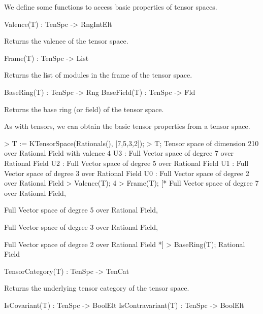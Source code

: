 We define some functions to access basic properties of tensor spaces.

\begin{intrinsics}
Valence(T) : TenSpc -> RngIntElt
\end{intrinsics}

Returns the valence of the tensor space.

\begin{intrinsics}
Frame(T) : TenSpc -> List
\end{intrinsics}

Returns the list of modules in the frame of the tensor space.

\begin{intrinsics}
BaseRing(T) : TenSpc -> Rng
BaseField(T) : TenSpc -> Fld
\end{intrinsics}

Returns the base ring (or field) of the tensor space.

\begin{example}[TenSpcProperties]

As with tensors, we can obtain the basic tensor properties from a tensor space.
\begin{code}
> T := KTensorSpace(Rationals(), [7,5,3,2]);
> T;
Tensor space of dimension 210 over Rational Field with valence 4
U3 : Full Vector space of degree 7 over Rational Field
U2 : Full Vector space of degree 5 over Rational Field
U1 : Full Vector space of degree 3 over Rational Field
U0 : Full Vector space of degree 2 over Rational Field
> Valence(T);
4
> Frame(T);
[*
    Full Vector space of degree 7 over Rational Field,

    Full Vector space of degree 5 over Rational Field,

    Full Vector space of degree 3 over Rational Field,

    Full Vector space of degree 2 over Rational Field
*]
> BaseRing(T);
Rational Field
\end{code}
\end{example}


\begin{intrinsics}
TensorCategory(T) : TenSpc -> TenCat
\end{intrinsics}

Returns the underlying tensor category of the tensor space.

\begin{intrinsics}
IsCovariant(T) : TenSpc -> BoolElt
IsContravariant(T) : TenSpc -> BoolElt
\end{intrinsics}

